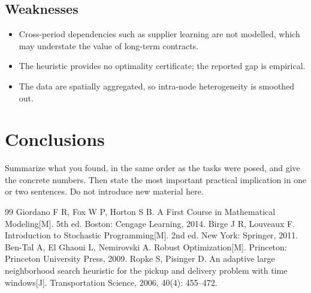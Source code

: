 \documentclass[12pt]{article}
\begin{document}
\subsection{Weaknesses}
\begin{itemize}
  \item Cross-period dependencies such as supplier learning are not modelled, which may
        understate the value of long-term contracts.
  \item The heuristic provides no optimality certificate; the reported gap is empirical.
  \item The data are spatially aggregated, so intra-node heterogeneity is smoothed out.
\end{itemize}

\section{Conclusions}
\label{sec:conclusions}

Summarize what you found, in the same order as the tasks were posed, and give the
concrete numbers. Then state the most important practical implication in one or two
sentences. Do not introduce new material here.

\newpage
\begin{thebibliography}{99}
   Giordano F R, Fox W P, Horton S B. A First Course in Mathematical
                 Modeling[M]. 5th ed. Boston: Cengage Learning, 2014.
   Birge J R, Louveaux F. Introduction to Stochastic Programming[M].
                 2nd ed. New York: Springer, 2011.
   Ben-Tal A, El Ghaoui L, Nemirovski A. Robust Optimization[M].
                 Princeton: Princeton University Press, 2009.
   Ropke S, Pisinger D. An adaptive large neighborhood search heuristic
                 for the pickup and delivery problem with time windows[J].
                 Transportation Science, 2006, 40(4): 455--472.
\end{thebibliography}
\end{document}
